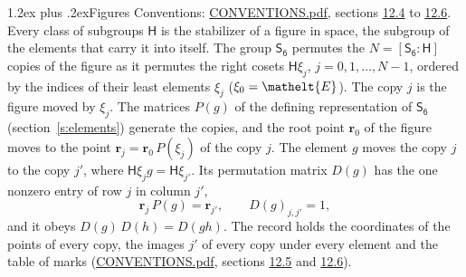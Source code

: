 \documentclass[10pt,a4paper]{article}
\makeatletter
\renewcommand\section{\@startsection{section}{1}{\z@}{-3ex plus -1ex minus -.2ex}%
  {1.2ex plus .2ex}{\normalfont\large\sffamily\bfseries\color{parttitle}}}
\numberwithin{equation}{section}
\newcommand{\eltfont}[1]{{\let\sigma\eltsigma\mathelt{#1}}}
\newcommand{\grp}[1]{\mathsf{#1}}
\newcommand{\cls}[1]{\eltfont{#1}}
\newcommand{\pointr}{\mathbf{r}}
\makeatother
\begin{document}
\section{Figures}\label{s:permutation}
Conventions: \href{../../CONVENTIONS.pdf}{CONVENTIONS.pdf}, sections \href{../../CONVENTIONS.pdf\#conv.12.4}{12.4} to \href{../../CONVENTIONS.pdf\#conv.12.6}{12.6}.
Every class of subgroups $\grp{H}$ is the stabilizer of a figure in space, the subgroup of the elements that carry it into itself. \label{n:local.orbit.size}\label{n:element.coset.least}\label{n:index.coset}The group $\grp{S_{6}}$ permutes the $N = [\grp{S_{6}} : \grp{H}]$ copies of the figure as it permutes the right cosets $\grp{H}\xi_j$, $j = 0, 1, \dots, N - 1$, ordered by the indices of their least elements $\xi_j$ ($\xi_0 = \cls{E}$). The copy $j$ is the figure moved by $\xi_j$. The matrices $P(g)$ of the defining representation of $\grp{S_{6}}$ (section~\ref{s:elements}) generate the copies, and the root point $\pointr_0$ of the figure moves to the point $\pointr_j = \pointr_0\, P(\xi_j)$ of the copy $j$. \label{n:local.coset.image}The element $g$ moves the copy $j$ to the copy $j'$, where $\grp{H}\xi_j g = \grp{H}\xi_{j'}$. \label{n:local.matrix.permutation}Its permutation matrix $D(g)$ has the one nonzero entry of row $j$ in column $j'$,
\begin{equation}\label{e:perm.matrix}\pointr_j\, P(g) = \pointr_{j'}, \qquad D(g)_{j,j'} = 1,\end{equation}
and it obeys $D(g)\, D(h) = D(gh)$. The record holds the coordinates of the points of every copy, the images $j'$ of every copy under every element and the table of marks (\href{../../CONVENTIONS.pdf}{CONVENTIONS.pdf}, sections \href{../../CONVENTIONS.pdf\#conv.12.5}{12.5} and \href{../../CONVENTIONS.pdf\#conv.12.6}{12.6}).
\end{document}
